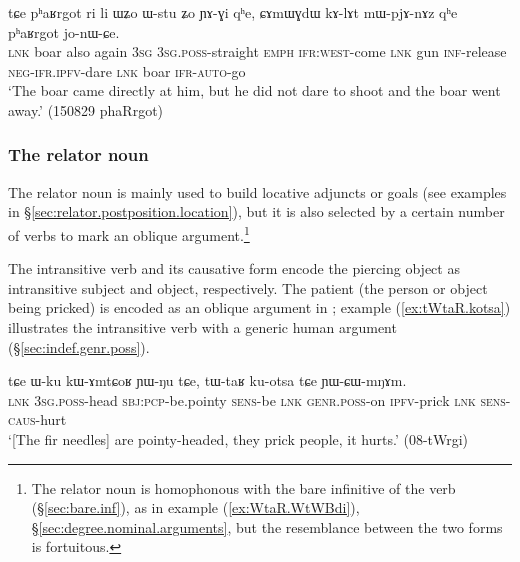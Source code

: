\begin{exe}
\ex \label{ex:Wstu.Zo.YAGi}
\gll  tɕe pʰaʁrgot ri li ɯʑo ɯ-stu ʑo ɲɤ-ɣi qʰe,  ɕɤmɯɣdɯ kɤ-lɤt mɯ-pjɤ-nɤz qʰe pʰaʁrgot jo-nɯ-ɕe. \\
\textsc{lnk} boar also again \textsc{3sg} \textsc{3sg}.\textsc{poss}-straight \textsc{emph} \textsc{ifr}:\textsc{west}-come \textsc{lnk} gun \textsc{inf}-release \textsc{neg}-\textsc{ifr}.\textsc{ipfv}-dare \textsc{lnk} boar \textsc{ifr}-\textsc{auto}-go \\
\glt `The boar came directly at him, but he did not dare to shoot and the boar went away.' (150829 phaRrgot)
\end{exe} 

\subsubsection{The relator noun } \label{sec:WtaR} 
The relator noun  is mainly used to build locative adjuncts or goals (see examples in §\ref{sec:relator.postposition.location}), but it is also selected by a certain number of verbs to mark an oblique argument.\footnote{The relator noun  is homophonous with the bare infinitive  of the verb  (§\ref{sec:bare.inf}), as in example (\ref{ex:WtaR.WtWBdi}), §\ref{sec:degree.nominal.arguments}, but the resemblance between the two forms is fortuitous. }

The intransitive verb  and its causative form  encode the piercing object as intransitive subject and object, respectively. The patient (the person or object being pricked) is encoded as an oblique argument in ; example (\ref{ex:tWtaR.kotsa}) illustrates the intransitive verb  with a generic human argument (§\ref{sec:indef.genr.poss}).

\begin{exe}
\ex \label{ex:tWtaR.kotsa}
\gll tɕe ɯ-ku kɯ-ɤmtɕoʁ ɲɯ-ŋu tɕe, tɯ-taʁ ku-otsa tɕe ɲɯ-ɕɯ-mŋɤm. \\
\textsc{lnk} \textsc{3sg}.\textsc{poss}-head \textsc{sbj}:\textsc{pcp}-be.pointy \textsc{sens}-be \textsc{lnk} \textsc{genr}.\textsc{poss}-on \textsc{ipfv}-prick \textsc{lnk} \textsc{sens}-\textsc{caus}-hurt \\
\glt `[The fir needles] are pointy-headed, they prick people, it hurts.'  (08-tWrgi) 
\end{exe} 

